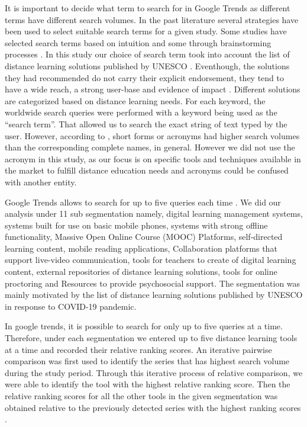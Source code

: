 \documentclass[11pt,a4paper,]{article}
\begin{document}
It is important to decide what term to search for in Google Trends as different terms have different search volumes. In the past literature several strategies have been used to select suitable search terms for a given study. Some studies have selected search terms based on intuition and some through brainstorming processes \autocite{vaughan2014web}. In this study our choice of search term took into account the list of distance learning solutions published by UNESCO \autocite{unesco2020DLsolutions}.
Eventhough, the solutions they had recommended do not carry their explicit endorsement, they tend to have a wide reach, a strong user-base and evidence of impact \autocite{unesco2020DLsolutions}. Different solutions are categorized based on distance learning needs. For each keyword, the worldwide search queries were performed with a keyword being used as the ``search term''. That allowed us to search the exact string of text typed by the user. However, according to \textcite{vaughan2014web}, short forms or acronyms had higher search volumes than the corresponding complete names, in general. However we did not use the acronym in this study, as our focus is on specific tools and techniques available in the market to fulfill distance education needs and acronyms could be confused with another entity.

Google Trends allows to search for up to five queries each time \autocite{vaughan2014web}. We did our analysis under 11 sub segmentation namely, digital learning management systems, systems built for use on basic mobile phones, systems with strong offline functionality, Massive Open Online Course (MOOC) Platforms, self-directed learning content, mobile reading applications, Collaboration platforms that support live-video communication, tools for teachers to create of digital learning content, external repositories of distance learning solutions, tools for online proctoring and Resources to provide psychosocial support. The segmentation was mainly motivated by the list of distance learning solutions published by UNESCO in response to COVID-19 pandemic.

In google trends, it is possible to search for only up to five queries at a time. Therefore, under each segmentation we entered up to five distance learning tools at a time and recorded their relative ranking scores. An iterative pairwise comparison was first used to identify the series that has highest search volume during the study period. Through this iterative process of relative comparison, we were able to identify the tool with the highest relative ranking score. Then the relative ranking scores for all the other tools in the given segmentation was obtained relative to the previously detected series with the highest ranking scores \autocite{vaughan2014web}.
\end{document}
